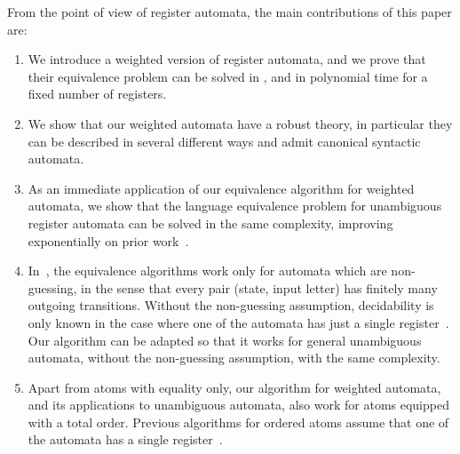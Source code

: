 \documentclass[10pt,a4paper]{amsart}
\numberwithin{equation}{section}
\newcommand{\exptime}{{\sc{ExpTime}}\xspace }
\begin{document}
From the point of view of register automata, the main contributions of this paper are:
\begin{enumerate}
    \item We introduce a weighted version of register automata, and we prove that their equivalence problem can be solved in \exptime, and in polynomial time for a fixed number of registers.
    \item We show that our weighted automata have a robust theory, in particular they can be described in several different ways and admit canonical syntactic automata. 
    \item As an immediate application of our equivalence algorithm for weighted automata, we show that the language equivalence problem for unambiguous register automata can be solved in the same complexity, improving  exponentially on prior work~\cite{clementeUnamb2021, MottetQ19}.
    \item In~\cite{clementeUnamb2021, MottetQ19}, the  equivalence algorithms  work only  for automata which are non-guessing, in the sense that every pair (state, input letter) has finitely many outgoing transitions. Without the non-guessing assumption, decidability is only known in the case where one of the automata has just a single register~\cite[Thm.~10]{MottetQ19Guessing}. Our algorithm can be adapted so that it works for general unambiguous automata, without the non-guessing assumption, with the same complexity.
    \item Apart from atoms with equality only, our algorithm for weighted automata, and its applications to unambiguous automata, also work for atoms equipped with a total order. Previous algorithms for ordered atoms assume that  one of the automata has a single register~\cite[Thm.~2]{MottetQ19}.
\end{enumerate}
\end{document}
